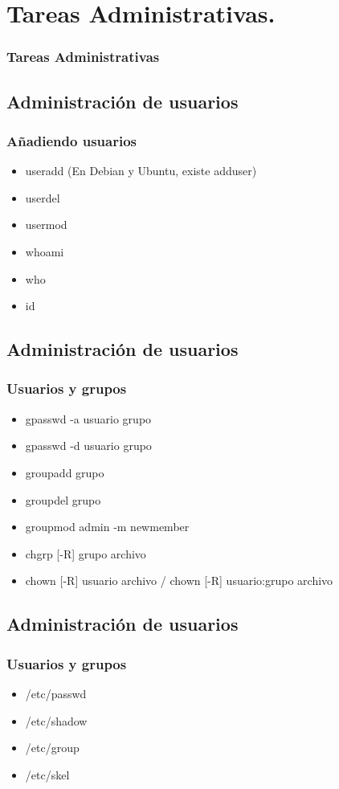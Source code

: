 \documentclass{beamer}
\begin{document}
\section{Tareas Administrativas.}
\begin{frame}
\tableofcontents[currentsection]
\frametitle{Tareas Administrativas}
\end{frame} 

\subsection{Administraci\'on de usuarios}
\begin{frame}
\frametitle{A\~nadiendo usuarios}
\begin{itemize}
\item useradd (En Debian y Ubuntu, existe adduser)
\item userdel
\item usermod
\item whoami
\item who
\item id
\end{itemize}
\end{frame}

\subsection{Administraci\'on de usuarios}
\begin{frame}
\frametitle{Usuarios y grupos}
	\begin{itemize}
	\item gpasswd -a usuario grupo
	\item gpasswd -d usuario grupo
	\item groupadd grupo
	\item groupdel grupo
	\item groupmod admin -m newmember
	\item chgrp [-R] grupo archivo
	\item chown [-R] usuario archivo / chown [-R] usuario:grupo archivo
	\end{itemize}
\end{frame}

\subsection{Administraci\'on de usuarios}
\begin{frame}
\frametitle{Usuarios y grupos}
\begin{itemize}
\item /etc/passwd
\item /etc/shadow 
\item /etc/group
\item /etc/skel
\end{itemize}
\end{frame}
\end{document}
